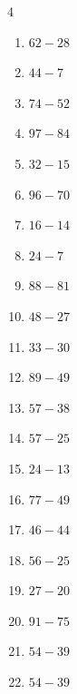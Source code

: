 \begin{multicols}{4}
\begin{enumerate}
  \item $62-28$
        \phantom{$=34$}

  \item $44-7$
        \phantom{$=37$}

  \item $74-52$
        \phantom{$=22$}

  \item $97-84$
        \phantom{$=13$}

  \item $32-15$
        \phantom{$=17$}

\columnbreak %

  \item $96-70$
        \phantom{$=26$}

  \item $16-14$
        \phantom{$=2$}

  \item $24-7$
        \phantom{$=17$}

  \item $88-81$
        \phantom{$=7$}

  \item $48-27$
        \phantom{$=21$}

  \item $33-30$
        \phantom{$=3$}

  \item $89-49$
        \phantom{$=40$}

  \item $57-38$
        \phantom{$=19$}

  \item $57-25$
        \phantom{$=32$}

  \item $24-13$
        \phantom{$=11$}

  \item $77-49$
        \phantom{$=28$}

  \item $46-44$
        \phantom{$=2$}

  \item $56-25$
        \phantom{$=31$}

  \item $27-20$
        \phantom{$=7$}

  \item $91-75$
        \phantom{$=16$}

  \item $54-39$
        \phantom{$=15$}

  \item $54-39$
        \phantom{$=15$}


\end{enumerate}
\end{multicols}
